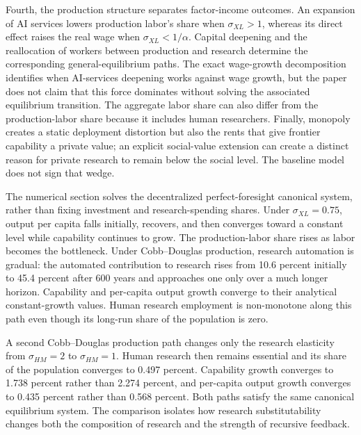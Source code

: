 Fourth, the production structure separates factor-income outcomes. An expansion of
AI services lowers production labor's share when $\sigma_{XL}>1$, whereas its direct
effect raises the real wage when $\sigma_{XL}<1/\alpha$. Capital deepening and the
reallocation of workers between production and research determine the corresponding
general-equilibrium paths. The exact wage-growth decomposition identifies when
AI-services deepening works against wage growth, but the paper does not claim that
this force dominates without solving the associated equilibrium transition. The
aggregate labor share can also differ from the production-labor share because it
includes human researchers. Finally, monopoly creates a static deployment
distortion but also the rents that give frontier capability a private value; an
explicit social-value extension can create a distinct reason for private research to
remain below the social level. The baseline model does not sign that wedge.

The numerical section solves the decentralized perfect-foresight canonical system,
rather than fixing investment and research-spending shares. Under
$\sigma_{XL}=0.75$, output per capita falls initially, recovers, and then converges
toward a constant level while capability continues to grow. The production-labor
share rises as labor becomes the bottleneck. Under Cobb--Douglas production,
research automation is gradual: the automated contribution to research rises from
10.6 percent initially to 45.4 percent after 600 years and approaches one only over
a much longer horizon. Capability and per-capita output growth converge to their
analytical constant-growth values. Human research employment is non-monotone along
this path even though its long-run share of the population is zero.

A second Cobb--Douglas production path changes only the research elasticity from
$\sigma_{HM}=2$ to $\sigma_{HM}=1$. Human research then remains essential and its
share of the population converges to 0.497 percent. Capability growth converges to
1.738 percent rather than 2.274 percent, and per-capita output growth converges to
0.435 percent rather than 0.568 percent. Both paths satisfy the same canonical
equilibrium system. The comparison isolates how research substitutability changes
both the composition of research and the strength of recursive feedback.

